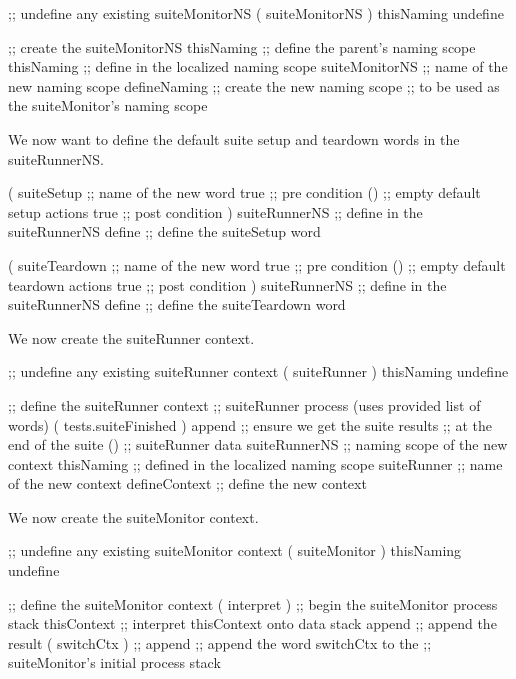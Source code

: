 \startJoylolCode
    ;; undefine any existing suiteMonitorNS
    ( suiteMonitorNS )
    thisNaming
    undefine

    ;; create the suiteMonitorNS
    thisNaming      ;; define the parent's naming scope
    thisNaming      ;; define in the localized naming scope
    suiteMonitorNS  ;; name of the new naming scope
    defineNaming    ;; create the new naming scope
                    ;; to be used as the suiteMonitor's naming scope
\stopJoylolCode

We now want to define the default suite setup and teardown words in the 
suiteRunnerNS. 

\startJoylolCode
    (
      suiteSetup  ;; name of the new word
      { true }    ;; pre condition
      ()          ;; empty default setup actions
      { true }    ;; post condition
    )
    suiteRunnerNS ;; define in the suiteRunnerNS
    define        ;; define the suiteSetup word
\stopJoylolCode

\startJoylolCode
    (
      suiteTeardown ;; name of the new word
      { true } ;; pre condition
      ()            ;; empty default teardown actions
      { true } ;; post condition
    )
    suiteRunnerNS ;; define in the suiteRunnerNS
    define        ;; define the suiteTeardown word
\stopJoylolCode

We now create the suiteRunner context.

\startJoylolCode
    ;; undefine any existing suiteRunner context
    ( suiteRunner )
    thisNaming
    undefine

    ;; define the suiteRunner context
                ;; suiteRunner process (uses provided list of words)
    ( tests.suiteFinished )
    append        ;; ensure we get the suite results
                  ;; at the end of the suite
    ()            ;; suiteRunner data
    suiteRunnerNS ;; naming scope of the new context
    thisNaming    ;; defined in the localized naming scope
    suiteRunner   ;; name of the new context
    defineContext ;; define the new context
\stopJoylolCode

We now create the suiteMonitor context.

\startJoylolCode
    ;; undefine any existing suiteMonitor context
    ( suiteMonitor )
    thisNaming
    undefine

    ;; define the suiteMonitor context
    ( interpret )   ;; begin the suiteMonitor process stack
    thisContext     ;; interpret thisContext onto data stack
    append          ;; append the result
    ( switchCtx )   ;;
    append          ;; append the word switchCtx to the 
                    ;; suiteMonitor's initial process stack
  

